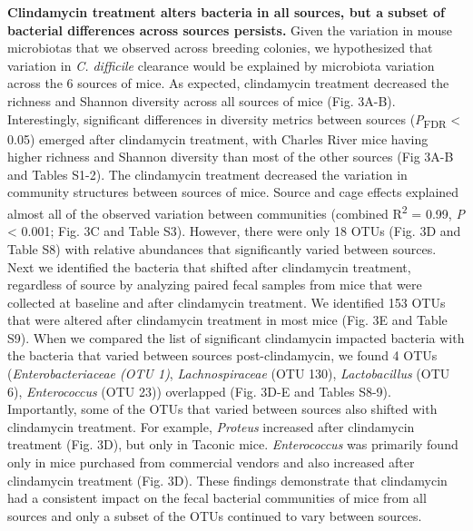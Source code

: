 \documentclass[
  11pt,
]{article}
\begin{document}
\textbf{Clindamycin treatment alters bacteria in all sources, but a
subset of bacterial differences across sources persists.} Given the
variation in mouse microbiotas that we observed across breeding
colonies, we hypothesized that variation in \emph{C. difficile}
clearance would be explained by microbiota variation across the 6
sources of mice. As expected, clindamycin treatment decreased the
richness and Shannon diversity across all sources of mice (Fig. 3A-B).
Interestingly, significant differences in diversity metrics between
sources (\emph{P}\textsubscript{FDR} \textless{} 0.05) emerged after
clindamycin treatment, with Charles River mice having higher richness
and Shannon diversity than most of the other sources (Fig 3A-B and
Tables S1-2). The clindamycin treatment decreased the variation in
community structures between sources of mice. Source and cage effects
explained almost all of the observed variation between communities
(combined R\textsuperscript{2} = 0.99, \emph{P} \textless{} 0.001; Fig.
3C and Table S3). However, there were only 18 OTUs (Fig. 3D and Table
S8) with relative abundances that significantly varied between sources.
Next we identified the bacteria that shifted after clindamycin
treatment, regardless of source by analyzing paired fecal samples from
mice that were collected at baseline and after clindamycin treatment. We
identified 153 OTUs that were altered after clindamycin treatment in
most mice (Fig. 3E and Table S9). When we compared the list of
significant clindamycin impacted bacteria with the bacteria that varied
between sources post-clindamycin, we found 4 OTUs
(\emph{Enterobacteriaceae (OTU 1)}, \emph{Lachnospiraceae} (OTU 130),
\emph{Lactobacillus} (OTU 6), \emph{Enterococcus} (OTU 23)) overlapped
(Fig. 3D-E and Tables S8-9). Importantly, some of the OTUs that varied
between sources also shifted with clindamycin treatment. For example,
\emph{Proteus} increased after clindamycin treatment (Fig. 3D), but only
in Taconic mice. \emph{Enterococcus} was primarily found only in mice
purchased from commercial vendors and also increased after clindamycin
treatment (Fig. 3D). These findings demonstrate that clindamycin had a
consistent impact on the fecal bacterial communities of mice from all
sources and only a subset of the OTUs continued to vary between sources.
\end{document}
